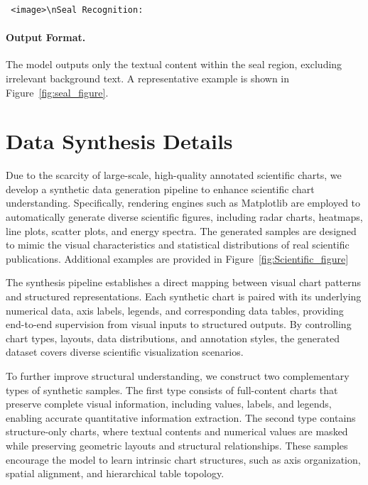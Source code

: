 \documentclass{fairmeta}
\begin{document}
\begin{verbatim} <image>\nSeal Recognition:
\end{verbatim}

\paragraph{Output Format.}

The model outputs only the textual content within the seal region, excluding irrelevant background text. A representative example is shown in Figure~\ref{fig:seal_figure}.


\section{Data Synthesis Details}

Due to the scarcity of large-scale, high-quality annotated scientific charts, we develop a synthetic data generation pipeline to enhance scientific chart understanding. Specifically, rendering engines such as Matplotlib are employed to automatically generate diverse scientific figures, including radar charts, heatmaps, line plots, scatter plots, and energy spectra. The generated samples are designed to mimic the visual characteristics and statistical distributions of real scientific publications. Additional examples are provided in Figure~\ref{fig:Scientific_figure}

The synthesis pipeline establishes a direct mapping between visual chart patterns and structured representations. Each synthetic chart is paired with its underlying numerical data, axis labels, legends, and corresponding data tables, providing end-to-end supervision from visual inputs to structured outputs. By controlling chart types, layouts, data distributions, and annotation styles, the generated dataset covers diverse scientific visualization scenarios.

To further improve structural understanding, we construct two complementary types of synthetic samples. The first type consists of full-content charts that preserve complete visual information, including values, labels, and legends, enabling accurate quantitative information extraction. The second type contains structure-only charts, where textual contents and numerical values are masked while preserving geometric layouts and structural relationships. These samples encourage the model to learn intrinsic chart structures, such as axis organization, spatial alignment, and hierarchical table topology.
\end{document}
